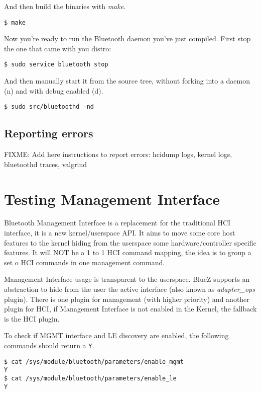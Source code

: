\documentclass[11pt]{article}
\begin{document}
And then build the binaries with {\em make}.

\begin{verbatim}
$ make
\end{verbatim}

Now you're ready to run the Bluetooth daemon you've just compiled. First stop
the one that came with you distro:

\begin{verbatim}
$ sudo service bluetooth stop
\end{verbatim}

And then manually start it from the source tree, without forking into a daemon
(n) and with debug enabled (d).

\begin{verbatim}
$ sudo src/bluetoothd -nd
\end{verbatim}

\subsection{Reporting errors}
FIXME: Add here instructions to report errors: hcidump logs, kernel logs, bluetoothd traces, valgrind

\section{Testing Management Interface}

Bluetooth Management Interface is a replacement for the traditional HCI
interface, it is a new kernel/userspace API. It aims to move some core host
features to the kernel hiding from the userspace some hardware/controller
specific features. It will NOT be a 1 to 1 HCI command mapping, the idea is
to group a set o HCI commands in one management command.

Management Interface usage is transparent to the userspace. BlueZ supports an
abstraction to hide from the user the active interface (also known as {\em
adapter\_ops} plugin). There is one plugin for management (with higher priority)
and another plugin for HCI, if Management Interface is not enabled in the
Kernel, the fallback is the HCI plugin.

To check if MGMT interface and LE discovery are enabled, the following commands
should return a \verb|Y|.

\begin{verbatim}
$ cat /sys/module/bluetooth/parameters/enable_mgmt
Y
$ cat /sys/module/bluetooth/parameters/enable_le
Y
\end{verbatim}
\end{document}
